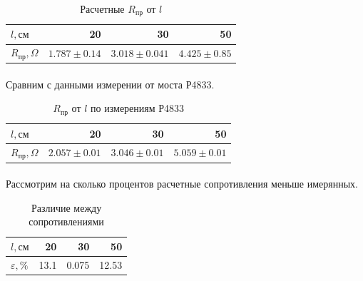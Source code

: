 \documentclass[a4paper,12pt]{article}
\begin{document}
    \begin{table}[H]
        \begin{center}

            \begin{tabular}{|l|r|r|r|}
            \hline
            $l, см$          &  20 & 30 & 50 \\
            \hline
            $R_{пр}, \Omega$ &  $1.787\pm0.14$ & $3.018\pm0.041$  & $4.425\pm0.85$\\
            \hline
            \end{tabular}
            \caption{Расчетные $R_{пр}$ от $l$}
        \end{center}

    \end{table}
    \paragraph{}
    Сравним с данными измерении от моста Р4833.

    \begin{table}[H]
        \begin{center}

        \begin{tabular}{|l|r|r|r|}
        \hline
        $l, см$          &  20 & 30 & 50 \\
        \hline
        $R_{пр}, \Omega$ &  $2.057\pm0.01$ & $3.046\pm0.01$ & $5.059\pm0.01$ \\
        \hline
        \end{tabular}
            \caption{$R_{пр}$ от $l$ по измерениям Р4833}
        \end{center}

    \end{table}

    \paragraph{}
    Рассмотрим на сколько процентов расчетные сопротивления меньше имерянных.

    \begin{table}[H]
        \begin{center}

        \begin{tabular}{|l|r|r|r|}
        \hline
        $l, см$          &  20 & 30 & 50 \\
        \hline
        $\varepsilon, \%$ &  13.1 & 0.075 & 12.53 \\
        \hline
        \end{tabular}
            \caption{Различие между сопротивлениями}
        \end{center}

    \end{table}
\end{document}
